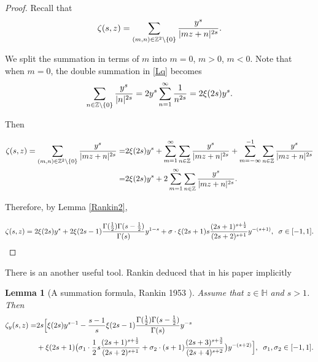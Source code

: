 \documentclass[reqno,english]{amsart}
\newtheorem{lemma}{Lemma}[section]
\newtheorem{open problem}{Open Problem}[section]
\newtheorem{open question}{Open Question}[section]
\newtheorem{open questions on hexagonal lattice}{Open Questions on hexagonal lattice}[section]
\begin{document}
\begin{proof}
Recall that
 \begin{equation}\aligned\label{Lq}
\zeta(s,z)=\sum_{(m,n)\in\mathbb{Z}^2\backslash\{0\}}\frac{y^s}{|mz+n|^{2s}}.
\endaligned\end{equation}

We split the summation in terms of $m$ into $m=0$, $m>0$, $m<0$.
Note that when $m=0$, the double summation in \eqref{Lq} becomes
 \begin{equation}\aligned\nonumber
\sum_{n\in\mathbb{Z}\backslash\{0\}}\frac{y^s}{|n|^{2s}}=2y^s\sum_{n=1}^\infty \frac{1}{n^{2s}}=2\xi(2s)y^s.
\endaligned\end{equation}

Then

\begin{equation}\aligned\label{JJ2}
\zeta(s,z)=\sum_{(m,n)\in\mathbb{Z}^2\backslash\{0\}}\frac{y^s}{|mz+n|^{2s}}
=&2\xi(2s)y^s
+\sum_{m=1}^\infty\sum_{n\in\mathbb{Z}}\frac{y^s}{|mz+n|^{2s}}
+\sum_{m=-\infty}^{-1}\sum_{n\in\mathbb{Z}}\frac{y^s}{|mz+n|^{2s}}\\
=&2\xi(2s)y^s
+2\sum_{m=1}^\infty\sum_{n\in\mathbb{Z}}\frac{y^s}{|mz+n|^{2s}}.
\endaligned\end{equation}

Therefore, by Lemma \ref{Rankin2},



 \begin{equation}\aligned\nonumber
\zeta(s,z)=2\xi(2s)y^s+
2\xi(2s-1)\frac{\Gamma(\frac{1}{2})\Gamma(s-\frac{1}{2})}{\Gamma(s)}y^{1-s}
+\sigma\cdot\xi(2s+1)s\frac{(2s+1)^{s+\frac{1}{2}}}{(2s+2)^{s+1}}y^{-(s+1)},\;\;\sigma\in[-1,1].
\endaligned\end{equation}

\end{proof}

There is an another useful tool. Rankin deduced that in his paper implicitly
\begin{lemma}[A summation formula, Rankin 1953 \cite{Ran1953}]\label{Rankin4} Assume that $z\in \mathbb{H}$ and $s>1$. Then
 \begin{equation}\aligned\nonumber
\zeta_y(s,z)=&2s\Big[
\xi(2s)y^{s-1}-
\frac{s-1}{s}\xi(2s-1)\frac{\Gamma(\frac{1}{2})\Gamma(s-\frac{1}{2})}{\Gamma(s)}y^{-s}\\
&+\xi(2s+1)\big(\sigma_1\cdot\frac{1}{2}s\frac{(2s+1)^{s+\frac{1}{2}}}{(2s+2)^{s+1}}
+\sigma_2\cdot(s+1)\frac{(2s+3)^{s+\frac{3}{2}}}{(2s+4)^{s+2}}
\big)
y^{-(s+2)}\Big],\;\;\sigma_1, \sigma_2\in[-1,1].
\endaligned\end{equation}
\end{lemma}
\end{document}
